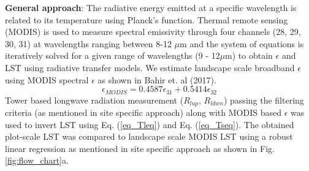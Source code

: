 \documentclass[fleqn,10pt]{wlscirep}
\begin{document}
{\textbf{General approach}:
The radiative energy emitted at a specific wavelength is related to its temperature using Planck's function\cite{wang_estimation_2005-1}. Thermal remote sensing (MODIS) is used to measure spectral emissivity through four channels (28, 29, 30, 31) at wavelengths ranging between 8-12 $\mu$m \cite{jin_improved_2006-1} and the system of equations is iteratively solved for a given range of wavelengths (9 - 12$\mu$m) to obtain $\epsilon$ and LST using radiative transfer models\cite{hulley_quantifying_2012-1,jin2006improved,wang_evaluation_2009}. We estimate landscape scale broadband $\epsilon$ using MODIS spectral $\epsilon$ as shown in Bahir et. al (2017)\cite{bahir_evaluation_2017}.
\begin{equation}\label{eq_emodis}
\epsilon_{MODIS}= 0.4587 \epsilon_{31} + 0.5414 \epsilon_{32}
\end{equation}
Tower based longwave radiation measurement ($R_{lup}$, $R_{ldwn}$) passing the filtering criteria (as mentioned in site specific approach) along with MODIS based $\epsilon$ was used to invert LST using Eq. (\ref{eq_Tleq}) and  Eq. (\ref{eq_Tseq}). The obtained plot-scale LST was compared to landscape scale MODIS LST using a robust linear regression as mentioned in site specific approach as shown in Fig. \ref{fig:flow_chart}a.


}
\end{document}
